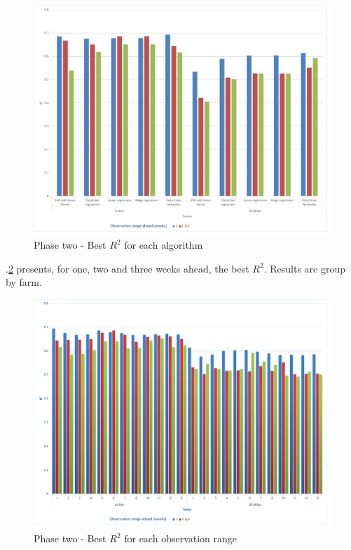 \documentclass[review]{elsarticle}
\begin{document}
\begin{figure}[H] 
 \centering
 \includegraphics[scale=.5]{Phase_two_Best_R2_for_each_algortihm}
 \caption{Phase two - Best $R^2$ for each algorithm} 
 \label{figura8} 
\end{figure}

\figurename $.$\ref{figura9} presents, for one, two and three weeks ahead, the best $R^2$. Results are group by farm.

\begin{figure}[H] 
 \centering
 \includegraphics[scale=.5]{Phase_two_Best_R2_for_each_number_of_observation_range_in_the_patterm}
 \caption{Phase two - Best $R^2$ for each observation range} 
 \label{figura9} 
\end{figure}
\end{document}
